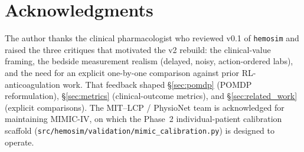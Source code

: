 \documentclass[11pt]{article}
\begin{document}
\section*{Acknowledgments}

The author thanks the clinical pharmacologist who reviewed v0.1 of \texttt{hemosim} and raised the three critiques that motivated the v2 rebuild: the clinical-value framing, the bedside measurement realism (delayed, noisy, action-ordered labs), and the need for an explicit one-by-one comparison against prior RL-anticoagulation work. That feedback shaped §\ref{sec:pomdp} (POMDP reformulation), §\ref{sec:metrics} (clinical-outcome metrics), and §\ref{sec:related_work} (explicit comparisons). The MIT--LCP / PhysioNet team is acknowledged for maintaining MIMIC-IV, on which the Phase~2 individual-patient calibration scaffold (\texttt{src/hemosim/validation/mimic\_calibration.py}) is designed to operate.



\end{document}
